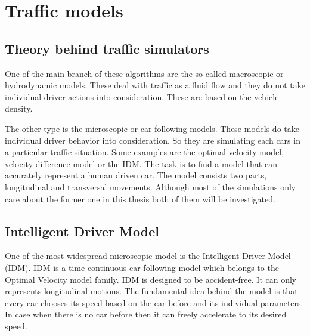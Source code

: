 \chapter{Traffic models}
	\section{Theory behind traffic simulators}
		One of the main branch of these algorithms are the so called macroscopic or hydrodynamic models. These deal with traffic as a fluid flow and they do not take individual driver actions into consideration. These are based on the vehicle density.

		The other type is the microscopic or car following models. These models do take individual driver behavior into consideration. So they are simulating each cars in a particular traffic situation. Some examples are the optimal velocity model, velocity difference model or the IDM. The task is to find a model that can accurately represent a human driven car. The model consists two parts, longitudinal and transversal movements. Although most of the simulations only care about the former one in this thesis both of them will be investigated.
	\section{Intelligent Driver Model} \label{sec:IDM}
		One of the most widespread microscopic model is the Intelligent Driver Model (IDM). IDM is a time continuous car following model which belongs to the Optimal Velocity model family. IDM is designed to be accident-free. It can only represents longitudinal motions. The fundamental idea behind the model is that every car chooses its speed based on the car before and its individual parameters. In case when there is no car before then it can freely accelerate to its desired speed.


